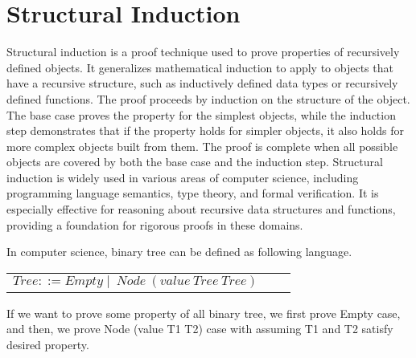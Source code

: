 \section{Structural Induction}
\label{sec:structural}
Structural induction is a proof technique used to prove properties of recursively defined objects.
It generalizes mathematical induction to apply to objects that have a recursive structure, such as inductively defined data types or recursively defined functions.
The proof proceeds by induction on the structure of the object.
The base case proves the property for the simplest objects, while the induction step demonstrates that if the property holds for simpler objects, it also holds for more complex objects built from them. The proof is complete when all possible objects are covered by both the base case and the induction step.
Structural induction is widely used in various areas of computer science, including programming language semantics, type theory, and formal verification.
It is especially effective for reasoning about recursive data structures and functions, providing a foundation for rigorous proofs in these domains.
\begin{example}
    In computer science, binary tree can be defined as following language. \\
    \begin{tabular}{rcl}        
    $Tree ::= Empty \mid\ Node\ (value\ Tree\ Tree) $ 
    \end{tabular}
    
    If we want to prove some property of all binary tree, we first prove Empty case, and then, we prove Node (value T1 T2) case with assuming
    T1 and T2 satisfy desired property.
\end{example}